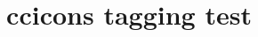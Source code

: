 \documentclass{article}
\title{ccicons tagging test}
\begin{document}
\ccLogo

\ccShareAlike

\ccbync
\end{document}
